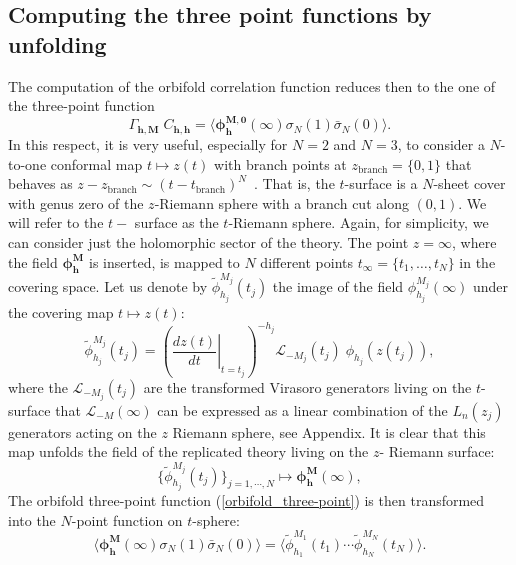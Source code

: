 \documentclass[a4paper,11pt]{article}
\begin{document}
\subsection{Computing the three point functions by unfolding}
The computation of the orbifold correlation function reduces then to the one of the three-point function
\begin{equation}\label{orbifold_three-point}
 \Gamma_{\boldsymbol{h},\boldsymbol{M}} \;C_{\boldsymbol{h},\boldsymbol{h}} = \langle \boldsymbol{\phi}^{\boldsymbol{M},\boldsymbol{0}}_{\boldsymbol{h}}(\infty) \sigma_{N}(1)\bar{\sigma}_{N}(0)\rangle.
\end{equation}
In this respect, it is very useful, especially for $N=2$ and $N=3$,  to consider a $N$-to-one conformal map
$t\mapsto z(t)$ with branch points at $z_{\text{branch}}=\{0, 1\}$  that behaves as $z-z_{\text{branch}}\sim (t-t_{\text{branch}})^N$~\cite{Lunin}.
That is, the $t$-surface is a $N$-sheet cover with genus zero 
 of the $z$-Riemann sphere with a branch cut along 
$(0,1)$. We will refer to the $t-$ surface as the $t$-Riemann sphere. Again, for simplicity, we can consider just the holomorphic sector of the theory. The point $z=\infty$, where the field $\boldsymbol{\phi}^{\boldsymbol{M}}_{\boldsymbol{h}}$  is inserted, is mapped to $N$ different points $t_\infty=\{t_1, \dots, t_N\}$ in 
the covering space. Let us denote by $\tilde{\phi}_{h_j}^{M_j}(t_j)$ the image
of the field $\phi_{h_j}^{M_j}(\infty)$ under the covering map $t\mapsto z(t)$:
\begin{equation}
\label{Jac}
\tilde{\phi}_{h_j}^{M_j}(t_j) = \left(\left.\frac{d z(t)}{d t}\right|_{t=t_j} \right)^{-h_j} \mathcal{L}_{-M_j}(t_j)\;\phi_{h_j} (z(t_j)),
\end{equation}
where the $\mathcal{L}_{-M_j}(t_j)$ are the transformed Virasoro generators living on the $t$- surface that  $\mathcal{L}_{-M}(\infty)$ can be expressed as a linear combination of the $L_{n}(z_j)$ generators acting on the $z$ Riemann sphere, see Appendix. 
It is clear that this map unfolds the field of the replicated theory living on the $z$- Riemann surface:
\begin{equation}
\{\tilde{\phi}_{h_j}^{M_j}(t_j)\}_{j=1,\cdots,N}\mapsto \boldsymbol{\phi}_{\boldsymbol{h}}^{\boldsymbol{M}}(\infty),
\end{equation}
The  orbifold  three-point function (\ref{orbifold_three-point})  is then transformed into the $N$-point function on $t$-sphere:
\begin{equation}\label{N-point}
\langle \boldsymbol{\phi}^{\boldsymbol{M}}_{\boldsymbol{h}}(\infty) \sigma_{N}(1)\bar{\sigma}_{N}(0)\rangle=\langle \tilde{\phi}^{M_1}_{h_1}(t_1)\cdots\tilde{\phi}_{h_N}^{M_N}(t_N)\rangle.
\end{equation}
\end{document}
